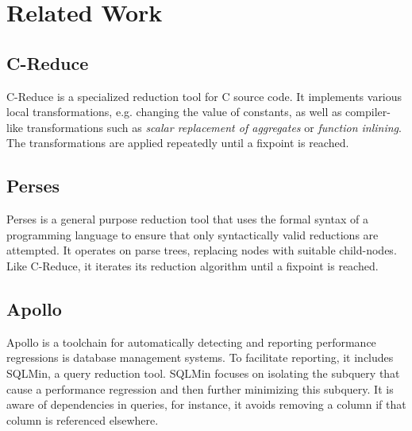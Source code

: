 \section{Related Work}
\subsection{C-Reduce}
C-Reduce is a specialized reduction tool for C source code. It implements various local transformations, e.g. changing the value of constants, as well as compiler-like transformations such as \textit{scalar replacement of aggregates} or \textit{function inlining}. The transformations are applied repeatedly until a fixpoint is reached.\cite{regehr2012reduction}

\subsection{Perses}
Perses is a general purpose reduction tool that uses the formal syntax of a programming language to ensure that only syntactically valid reductions are attempted. It operates on parse trees, replacing nodes with suitable child-nodes. Like C-Reduce, it iterates its reduction algorithm until a fixpoint is reached.\cite{sun2019perses}

\subsection{Apollo}
Apollo is a toolchain for automatically detecting and reporting performance regressions is database management systems. To facilitate reporting, it includes SQLMin, a query reduction tool. SQLMin focuses on isolating the subquery that cause a performance regression and then further minimizing this subquery. It is aware of dependencies in queries, for instance, it avoids removing a column if that column is referenced elsewhere.\cite{jung2019apollo}